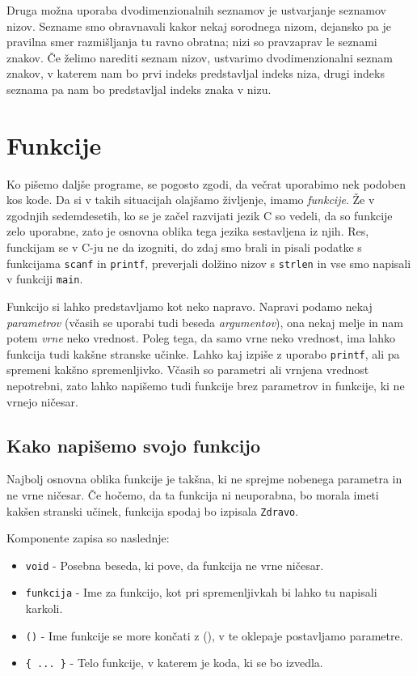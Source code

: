 \documentclass{book}
\begin{document}
Druga možna uporaba dvodimenzionalnih seznamov je ustvarjanje seznamov nizov.
Sezname smo obravnavali kakor nekaj sorodnega nizom, dejansko pa je pravilna
smer razmišljanja tu ravno obratna; nizi so pravzaprav le seznami znakov.
Če želimo narediti seznam nizov, ustvarimo dvodimenzionalni seznam znakov, v
katerem nam bo prvi indeks predstavljal indeks niza, drugi indeks seznama pa nam
bo predstavljal indeks znaka v nizu.

\chapter{Funkcije}

Ko pišemo daljše programe, se pogosto zgodi, da večrat uporabimo nek podoben
kos kode. Da si v takih situacijah olajšamo življenje, imamo \emph{funkcije}.
Že v zgodnjih sedemdesetih, ko se je začel razvijati jezik C so vedeli, da so
funkcije zelo uporabne, zato je osnovna oblika tega jezika sestavljena iz njih.
Res, funckijam se v C-ju ne da izogniti, do zdaj smo brali in pisali podatke s
funkcijama \verb+scanf+ in \verb+printf+, preverjali dolžino nizov s
\verb+strlen+ in vse smo napisali v funkciji \verb+main+.

Funkcijo si lahko predstavljamo kot neko napravo. Napravi podamo nekaj
\emph{parametrov} (včasih se uporabi tudi beseda \emph{argumentov}), ona nekaj
melje in nam potem \emph{vrne} neko vrednost. Poleg tega, da samo vrne neko
vrednost, ima lahko funkcija tudi kakšne stranske učinke. Lahko kaj izpiše z
uporabo \verb+printf+, ali pa spremeni kakšno spremenljivko. Včasih so
parametri ali vrnjena vrednost nepotrebni, zato lahko napišemo tudi funkcije
brez parametrov in funkcije, ki ne vrnejo ničesar.


\section{Kako napišemo svojo funkcijo}

Najbolj osnovna oblika funkcije je takšna, ki ne sprejme nobenega parametra in
ne vrne ničesar. Če hočemo, da ta funkcija ni neuporabna, bo morala imeti
kakšen stranski učinek, funkcija spodaj bo izpisala \verb+Zdravo+.


Komponente zapisa so naslednje:
\begin{itemize}
\item \verb+void+ - Posebna beseda, ki pove, da funkcija ne vrne ničesar.
\item \verb+funkcija+ - Ime za funkcijo, kot pri spremenljivkah bi lahko tu
  napisali karkoli.
\item \verb+()+ - Ime funkcije se more končati z (), v te oklepaje
  postavljamo parametre.
\item \verb+{ ... }+ - Telo funkcije, v katerem je koda, ki se bo izvedla.
\end{itemize}
\end{document}
